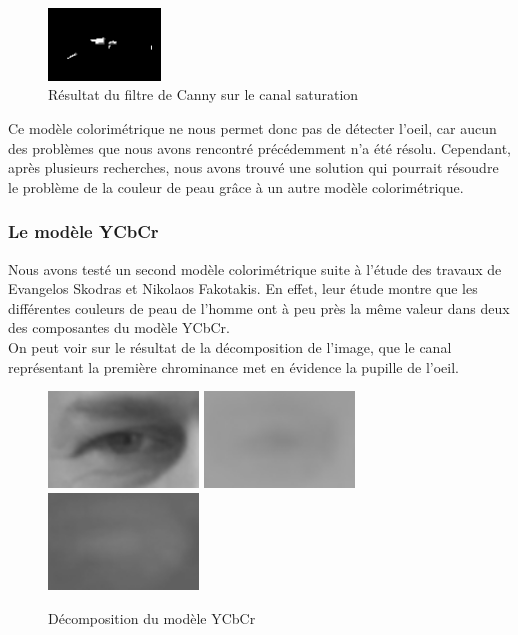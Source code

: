 \begin{figure}[H]
 \center
 \includegraphics[width=3cm]{image/cannySaturation.png}
 \caption{Résultat du filtre de Canny sur le canal saturation}
\end{figure}

Ce modèle colorimétrique ne nous permet donc pas de détecter l'oeil, car aucun des problèmes que nous avons rencontré
précédemment n'a été résolu. Cependant, après plusieurs recherches, nous avons trouvé une solution qui pourrait résoudre
le problème de la couleur de peau grâce à un autre modèle colorimétrique.

\subsubsection{Le modèle YCbCr}

Nous avons testé un second modèle colorimétrique suite à l'étude des travaux de Evangelos Skodras et Nikolaos Fakotakis\cite{Skodras_2012ieee}.
En effet, leur étude montre que les différentes couleurs de peau de l'homme ont à peu près la même valeur dans deux des
composantes du modèle YCbCr.\\

On peut voir sur le résultat de la décomposition de l'image, que le canal représentant la première chrominance met 
en évidence la pupille de l'oeil.
\begin{figure}[H]
 \center
 \includegraphics[width=4cm]{image/luminance.png}
 \includegraphics[width=4cm]{image/chrominance1.png}
 \includegraphics[width=4cm]{image/chrominance2.png}
 \caption{Décomposition du modèle YCbCr}
\end{figure}

